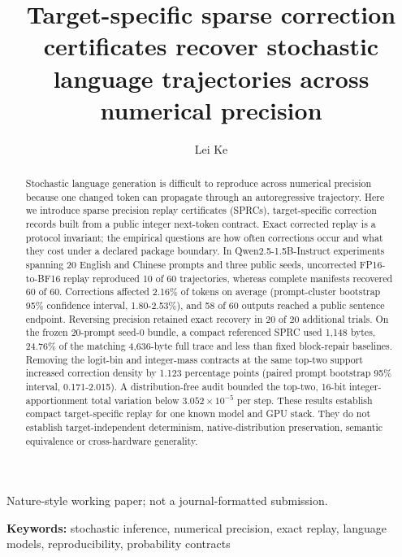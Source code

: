 \documentclass{nature}
\title{Target-specific sparse correction certificates recover stochastic language trajectories across numerical precision}
\author{Lei Ke}
\begin{document}
\maketitle
\par\smallskip
\noindent\textsf{\small Nature-style working paper; not a journal-formatted submission.}\par
{}


\begin{abstract}

Stochastic language generation is difficult to reproduce across numerical precision because one changed token can propagate through an autoregressive trajectory. Here we introduce sparse precision replay certificates (SPRCs), target-specific correction records built from a public integer next-token contract. Exact corrected replay is a protocol invariant; the empirical questions are how often corrections occur and what they cost under a declared package boundary. In Qwen2.5-1.5B-Instruct experiments spanning 20 English and Chinese prompts and three public seeds, uncorrected FP16-to-BF16 replay reproduced 10 of 60 trajectories, whereas complete manifests recovered 60 of 60. Corrections affected 2.16\% of tokens on average (prompt-cluster bootstrap 95\% confidence interval, 1.80-2.53\%), and 58 of 60 outputs reached a public sentence endpoint. Reversing precision retained exact recovery in 20 of 20 additional trials. On the frozen 20-prompt seed-0 bundle, a compact referenced SPRC used 1,148 bytes, 24.76\% of the matching 4,636-byte full trace and less than fixed block-repair baselines. Removing the logit-bin and integer-mass contracts at the same top-two support increased correction density by 1.123 percentage points (paired prompt bootstrap 95\% interval, 0.171-2.015). A distribution-free audit bounded the top-two, 16-bit integer-apportionment total variation below \(3.052\times10^{-5}\) per step. These results establish compact target-specific replay for one known model and GPU stack. They do not establish target-independent determinism, native-distribution preservation, semantic equivalence or cross-hardware generality.

\end{abstract}

\noindent\textbf{Keywords:} stochastic inference, numerical precision, exact replay, language models, reproducibility, probability contracts

\linenumbers
\end{document}
